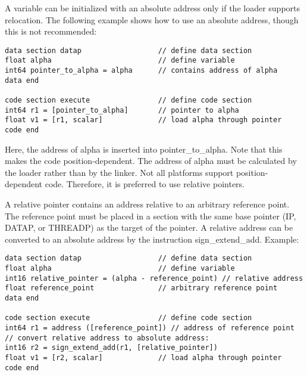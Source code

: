 \documentclass[forwardcom.tex]{subfiles}
\begin{document}
A variable can be initialized with an absolute address only if the loader supports relocation. The following example shows how to use an absolute address, though this is not recommended:

\begin{example}
\label{absolutePointer}
\end{example} %
\begin{lstlisting}[frame=single]
data section datap                  // define data section
float alpha                         // define variable
int64 pointer_to_alpha = alpha      // contains address of alpha
data end

code section execute                // define code section
int64 r1 = [pointer_to_alpha]       // pointer to alpha
float v1 = [r1, scalar]             // load alpha through pointer
code end
\end{lstlisting}
\vv

Here, the address of alpha is inserted into pointer\_to\_alpha. Note that this makes the code position-dependent. The address of alpha must be calculated by the loader rather than by the linker. Not all platforms support position-dependent code. Therefore, it is preferred to use relative pointers.
\vspace{4mm}

A relative pointer contains an address relative to an arbitrary reference point. The reference point must be placed in a section with the same base pointer (IP, DATAP, or THREADP) as the target of the pointer. A relative address can be converted to an absolute address by the instruction sign\_extend\_add. Example:

\begin{example}
\label{relativeDataPointer}
\end{example}
\begin{lstlisting}[frame=single]
data section datap                  // define data section
float alpha                         // define variable
int16 relative_pointer = (alpha - reference_point) // relative address
float reference_point               // arbitrary reference point
data end

code section execute                // define code section
int64 r1 = address ([reference_point]) // address of reference point
// convert relative address to absolute address:
int16 r2 = sign_extend_add(r1, [relative_pointer])
float v1 = [r2, scalar]             // load alpha through pointer
code end
\end{lstlisting}
\vv
\end{document}
